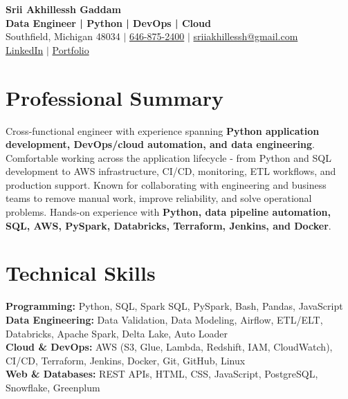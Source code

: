 \documentclass[letterpaper,10pt]{article}
\begin{document}
\fontsize{9.35pt}{10.45pt}\selectfont

\begin{center}
    {\LARGE \textbf{Srii Akhillessh Gaddam}} \\[-1pt]
    \textbf{Data Engineer | Python | DevOps | Cloud} \\[2pt]
    Southfield, Michigan 48034 $|$
    \href{tel:6468752400}{646-875-2400} $|$
    \href{mailto:sriiakhillessh@gmail.com}{sriiakhillessh@gmail.com} \\[1pt]
    \href{https://www.linkedin.com/in/srii-akhiilessh-gaddam-b48668191/}{LinkedIn} $|$
    \href{https://sriiakhillesshg.github.io/portfolio/}{Portfolio}
\end{center}
\vspace{-8pt}

\section{Professional Summary}
\small{Cross-functional engineer with experience spanning \textbf{Python application development, DevOps/cloud automation, and data engineering}. Comfortable working across the application lifecycle - from Python and SQL development to AWS infrastructure, CI/CD, monitoring, ETL workflows, and production support. Known for collaborating with engineering and business teams to remove manual work, improve reliability, and solve operational problems. Hands-on experience with \textbf{Python, data pipeline automation, SQL, AWS, PySpark, Databricks, Terraform, Jenkins, and Docker}.}

\section{Technical Skills}
\small{
\textbf{Programming:} Python, SQL, Spark SQL, PySpark, Bash, Pandas, JavaScript \\
\textbf{Data Engineering:} Data Validation, Data Modeling, Airflow, ETL/ELT, Databricks, Apache Spark, Delta Lake, Auto Loader \\
\textbf{Cloud \& DevOps:} AWS (S3, Glue, Lambda, Redshift, IAM, CloudWatch), CI/CD, Terraform, Jenkins, Docker, Git, GitHub, Linux \\
\textbf{Web \& Databases:} REST APIs, HTML, CSS, JavaScript, PostgreSQL, Snowflake, Greenplum
}

\end{document}
